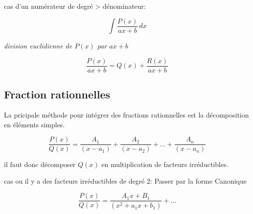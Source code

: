 \documentclass{article}
\newcommand{\smalltext}[1]{
    \scriptsize
    \textit{#1}
    \normalsize
}
\begin{document}
\hrulefill

cas d'un numérateur de degré > dénominateur:

\begin{center}
\begin{equation*}
    \int \frac{P(x)}{ax+b} \, dx
\end{equation*}
\smalltext{division euclidienne de $P(x)$ par $ax+b$}
\begin{equation*}
    \frac{P(x)}{ax+b} = Q(x) + \frac{R(x)}{ax+b}
\end{equation*}
\end{center}
    

\subsection*{Fraction rationnelles}

La pricipale méthode pour intégrer des fractions rationnelles est la décomposition en éléments simples.

\begin{equation*}
    \frac{P(x)}{Q(x)} = \frac{A_1}{(x-a_1)} + \frac{A_2}{(x-a_2)} + \ldots + \frac{A_n}{(x-a_n)}
\end{equation*}

il faut donc décomposer $Q(x)$ en multiplication de facteurs irréductibles.


cas ou il y a des facteurs irréductibles de degré 2:
Passer par la forme Canonique

\begin{equation*}
    \frac{P(x)}{Q(x)} = \frac{A_1 x + B_1}{(x^2 + a_1 x + b_1)} + \ldots
\end{equation*}
\end{document}
